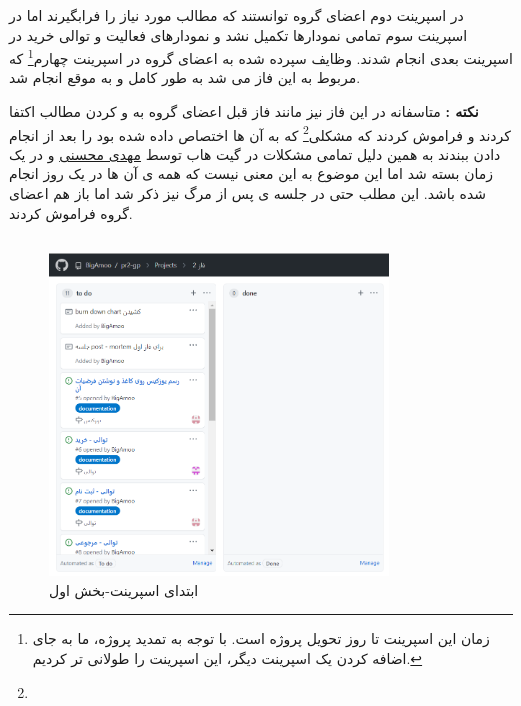 \documentclass[12pt,a4paper]{article}
\begin{document}
در اسپرینت دوم اعضای گروه توانستند که مطالب مورد نیاز را فرابگیرند اما در اسپرینت سوم تمامی نمودارها تکمیل نشد و نمودارهای فعالیت و توالی خرید در اسپرینت بعدی انجام شدند. وظایف سپرده شده به اعضای گروه در اسپرینت چهارم\footnote{زمان این اسپرینت تا روز تحویل پروژه است. با توجه به تمدید پروژه، ما به جای اضافه کردن یک اسپرینت دیگر، این اسپرینت را طولانی تر کردیم.} که مربوط به این فاز می شد به طور کامل و به موقع انجام شد. 


\textbf{نکته :} متاسفانه در این فاز نیز مانند فاز قبل اعضای گروه به  و  کردن مطالب اکتفا کردند و فراموش کردند که مشکلی\footnote{} که به آن ها اختصاص داده شده بود را بعد از انجام دادن ببندند به همین دلیل تمامی مشکلات در گیت هاب توسط \underline{مهدی محسنی} و در یک زمان بسته شد اما این موضوع به این معنی نیست که همه ی آن ها در یک روز انجام شده باشد. این مطلب حتی در جلسه ی پس از مرگ نیز ذکر شد اما باز هم اعضای گروه فراموش کردند.

\pagebreak
	\subsection{} \label{section.report.taskBoard}
			\begin{figure}[h!]
			\begin{center}
				\includegraphics[width=9cm]{images/screenshot_1.png}	
			\end{center}
			\caption{ابتدای اسپرینت-بخش اول}
		\end{figure}
		
\end{document}
